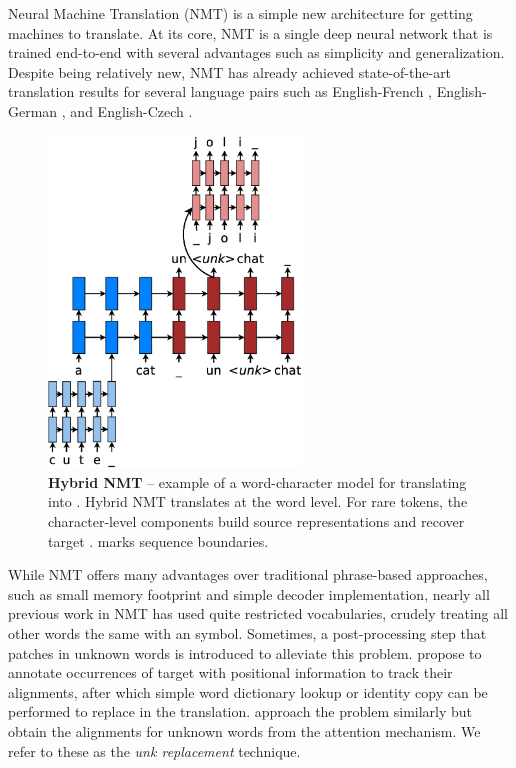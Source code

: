 Neural Machine Translation (NMT) is a simple new architecture for getting
machines to translate. At its core, NMT is a single deep 
neural network that is trained end-to-end with several advantages such as
simplicity and generalization. Despite being relatively new, NMT has already
achieved state-of-the-art translation results for several language pairs 
such as English-French \cite{luong15}, English-German
\cite{jean15,luong15attn,luong15iwslt}, and English-Czech \cite{jean15wmt}. 
\begin{figure}%
\centering
\includegraphics[width=0.6\textwidth, clip=true, trim= 0 0 0 0]{img/5-nmt_hybrid}
\caption[Hybrid NMT]{{\bf Hybrid NMT} -- example of a word-character model for translating
 into . Hybrid NMT translates at the word level. For rare tokens,
the character-level components build source representations
and recover target \unk{}. \word{\_} marks sequence
boundaries.}
\label{f:hybrid}
\end{figure}

While NMT offers many advantages over traditional phrase-based approaches, such as
small memory footprint and simple decoder implementation, nearly all previous
work in NMT has used quite restricted vocabularies, crudely treating all other
words the same with an \unk{} symbol. Sometimes, a post-processing step that
patches in unknown words is introduced to alleviate this problem. %
 propose to annotate occurrences of target \unk{} with positional information to
track their alignments, after which simple word dictionary
lookup or identity copy can be performed to replace \unk{} in the translation.
 approach the problem similarly but obtain the alignments for unknown
words from the attention mechanism. We refer to these as the {\it
unk replacement} technique.

